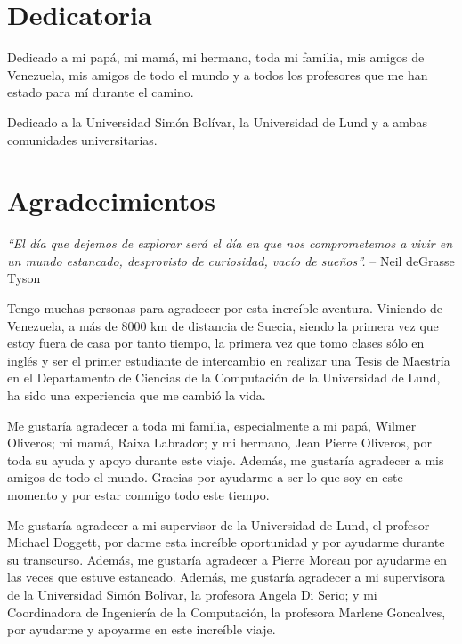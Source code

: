 \documentclass[pregrado]{tesis-usb} %
\begin{document}
\frontmatter
\maketitle
\chapter*{Dedicatoria}

Dedicado a mi papá, mi mamá, mi hermano, toda mi familia, mis amigos de Venezuela, mis amigos de todo el mundo y a todos los profesores que me han estado para mí durante el camino. 

\par Dedicado a la Universidad Sim\'on Bol\'ivar, la Universidad de Lund y a ambas comunidades universitarias.

\chapter*{Agradecimientos}

\emph{“El día que dejemos de explorar será el día en que nos comprometemos a vivir en un mundo estancado, desprovisto de curiosidad, vacío de sueños”.}
– Neil deGrasse Tyson

Tengo muchas personas para agradecer por esta increíble aventura. Viniendo de Venezuela, a más de 8000 km de distancia de Suecia, siendo la primera vez que estoy fuera de casa por tanto tiempo, la primera vez que tomo clases sólo en inglés y ser el primer estudiante de intercambio en realizar una Tesis de Maestría en el Departamento de Ciencias de la Computación de la Universidad de Lund, ha sido una experiencia que me cambió la vida.

Me gustaría agradecer a toda mi familia, especialmente a mi papá, Wilmer Oliveros; mi mamá, Raixa Labrador; y mi hermano, Jean Pierre Oliveros, por toda su ayuda y apoyo durante este viaje. Además, me gustaría agradecer a mis amigos de todo el mundo. Gracias por ayudarme a ser lo que soy en este momento y por estar conmigo todo este tiempo.

Me gustaría agradecer a mi supervisor de la Universidad de Lund, el profesor Michael Doggett, por darme esta increíble oportunidad y por ayudarme durante su transcurso. Además, me gustaría agradecer a Pierre Moreau por ayudarme en las veces que estuve estancado.
Además, me gustaría agradecer a mi supervisora de la Universidad Simón Bolívar, la profesora Angela Di Serio; y mi Coordinadora de Ingeniería de la Computación, la profesora Marlene Goncalves, por ayudarme y apoyarme en este increíble viaje.
\end{document}
